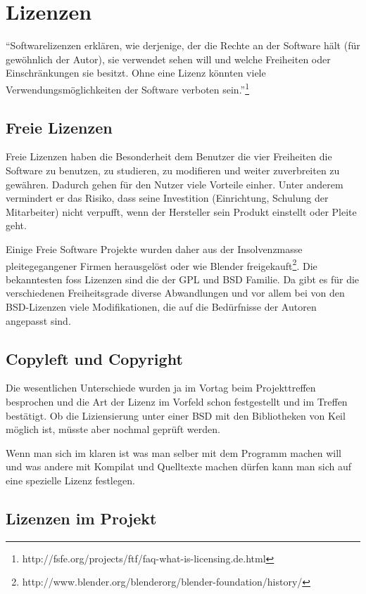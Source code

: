 \section{Lizenzen}

\enquote{Softwarelizenzen erklären, wie derjenige, der die Rechte an der Software hält (für gewöhnlich der Autor), sie verwendet sehen will und welche Freiheiten oder Einschränkungen sie besitzt. Ohne eine Lizenz könnten viele Verwendungsmöglichkeiten der Software verboten sein.}\footnote{http://fsfe.org/projects/ftf/faq-what-is-licensing.de.html}

\subsection{Freie Lizenzen}

Freie Lizenzen haben die Besonderheit dem Benutzer die vier Freiheiten die Software zu benutzen, zu studieren, zu modifieren und weiter zuverbreiten zu gewähren. Dadurch gehen für den Nutzer viele Vorteile einher. Unter anderem vermindert er das Risiko, dass seine Investition (Einrichtung, Schulung der Mitarbeiter) nicht verpufft, wenn der Hersteller sein Produkt einstellt oder Pleite geht.

Einige Freie Software Projekte wurden daher aus der Insolvenzmasse pleitegegangener Firmen herausgelöst oder wie Blender freigekauft\footnote{http://www.blender.org/blenderorg/blender-foundation/history/}.
Die bekanntesten \Gls{foss} Lizenzen sind die der GPL und BSD Familie. Da gibt es für die verschiedenen Freiheitsgrade diverse Abwandlungen und vor allem bei von den BSD-Lizenzen viele Modifikationen, die auf die Bedürfnisse der Autoren angepasst sind.

\subsection{Copyleft und Copyright}

Die wesentlichen Unterschiede wurden ja im Vortag beim Projekttreffen besprochen und die Art der Lizenz im Vorfeld schon festgestellt und im Treffen bestätigt.
Ob die Liziensierung unter einer BSD mit den Bibliotheken von Keil möglich ist, müsste aber nochmal geprüft werden.

Wenn man sich im klaren ist was man selber mit dem Programm machen will und was andere mit Kompilat und Quelltexte machen dürfen kann man sich auf eine spezielle Lizenz festlegen.

\subsection{Lizenzen im Projekt}

